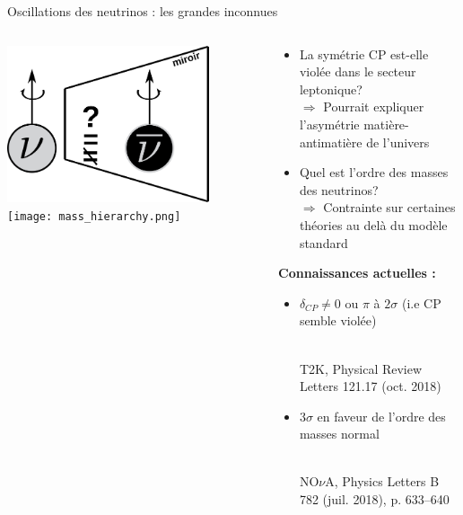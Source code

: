     \begin{frame}{Oscillations des neutrinos : les grandes inconnues}
        \begin{columns}
            \begin{column}{0.5\textwidth}
                \includegraphics[width=0.8\textwidth]{./pictures/CP_schema.png}\\
                \texttt{[image: mass\_hierarchy.png]}
            \end{column}
            \begin{column}{0.5\textwidth}
                \begin{scriptsize}
                    \begin{itemize}
                        \item La symétrie CP est-elle violée dans le secteur leptonique?  \\ $\Rightarrow$ Pourrait expliquer l'asymétrie matière-antimatière de l'univers
                        \item Quel est l'ordre des masses des neutrinos?  \\ $\Rightarrow$ Contrainte sur certaines théories au delà du modèle standard 
                    \end{itemize}
                    \vspace{0.4cm}
                    \textbf{Connaissances actuelles :}
                \end{scriptsize}
                \begin{itemize}
                    \item \begin{scriptsize}$\delta_{CP} \ne 0$ ou $\pi$ à $2\sigma$ (i.e CP semble violée)\end{scriptsize} \\  \tiny{T2K, Physical Review Letters 121.17 (oct. 2018)}
                    \item \begin{scriptsize}3$\sigma$ en faveur de l'ordre des masses normal\end{scriptsize} \\ \tiny{NO$\nu$A, Physics Letters B 782 (juil. 2018), p. 633–640}
                \end{itemize}
            \end{column}
        \end{columns}
    \end{frame}

